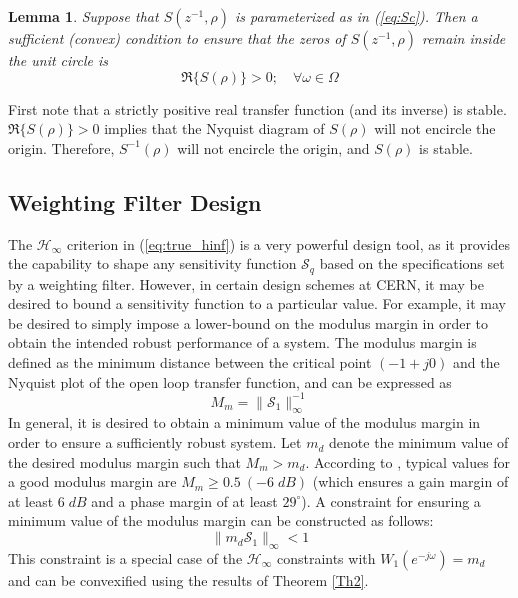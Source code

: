 \documentclass[journal]{IEEEtran}
\newtheorem{lemma}{Lemma}
\begin{document}
\begin{lemma}
Suppose that $S(z^{-1},\rho)$ is parameterized as in (\ref{eq:Sc}). Then a sufficient (convex) condition to ensure that the zeros of $S(z^{-1},\rho)$ remain inside the unit circle is
\begin{equation} \label{eq:con_con}
\Re \{S(\rho) \} > 0; \quad \forall \omega \in \Omega
\end{equation}
\end{lemma}
\begin{IEEEproof}
First note that a strictly positive real transfer function (and its inverse) is stable. $\Re \{S(\rho) \} > 0$ implies that the Nyquist diagram of $S(\rho)$ will not encircle the origin. Therefore, $S^{-1}(\rho)$ will not encircle the origin, and $S(\rho)$ is stable.    
\end{IEEEproof}


\subsection{Weighting Filter Design}
\label{sec:weighting_filter}
The $\mathcal{H}_{\infty}$ criterion in (\ref{eq:true_hinf}) is a very powerful design tool, as it provides the capability to shape any sensitivity function $\mathcal{S}_q$ based on the specifications set by a weighting filter. However, in certain design schemes at CERN, it may be desired to bound a sensitivity function to a particular value. For example, it may be desired to simply impose a lower-bound on the modulus margin in order to obtain the intended robust performance of a system. The modulus margin is defined as the minimum distance between the critical point $(-1+j0)$ and the Nyquist plot of the open loop transfer function, and can be expressed as
\begin{equation}
M_m = \| \mathcal{S}_1 \| ^{-1}_{\infty}
\end{equation}
In general, it is desired to obtain a minimum value of the modulus margin in order to ensure a sufficiently robust system. Let $m_d$ denote the minimum value of the desired modulus margin such that $M_m > m_d$. According to \cite{LZ06}, typical values for a good modulus margin are $M_m \geq 0.5 \ (-6 \; dB)$ (which ensures a gain margin of at least $6 \; dB$ and a phase margin of at least $29^{\circ}$). A constraint for ensuring a minimum value of the modulus margin can be constructed as follows:
\begin{equation}
  \| m_d \mathcal{S}_1 \|_\infty < 1 
\end{equation}
This constraint is a special case of the $\mathcal{H}_\infty$ constraints with $W_1(e^{-j\omega})=m_d$ and can be convexified using the results of Theorem \ref{Th2}.
\end{document}
